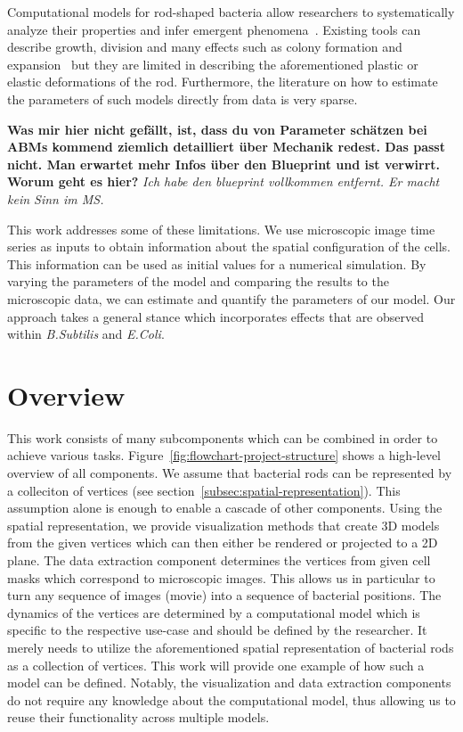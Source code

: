 \documentclass[10pt,letterpaper]{article}
\begin{document}
Computational models for rod-shaped bacteria allow researchers to systematically analyze their
properties and infer emergent phenomena~\cite{Cho2007,Jnsson2005}.
Existing tools can describe growth, division and many effects such as colony formation and
expansion~\cite{Matyjaszkiewicz2017,Doumic2020} but they are limited in describing the
aforementioned plastic or elastic deformations of the rod. Furthermore, the literature on how to
estimate the parameters of such models directly from data is very sparse.

\textbf{
    Was mir hier nicht gefällt, ist, dass du von Parameter schätzen bei ABMs kommend ziemlich
    detailliert über Mechanik redest.
    Das passt nicht.
    Man erwartet mehr Infos über den Blueprint und ist verwirrt.
    Worum geht es hier?
}
\textit{Ich habe den blueprint vollkommen entfernt. Er macht kein Sinn im MS.}

This work addresses some of these limitations.
We use microscopic image time series as inputs to obtain information about the spatial configuration
of the cells.
This information can be used as initial values for a numerical simulation.
By varying the parameters of the model and comparing the results to the microscopic data, we can
estimate and quantify the parameters of our model.
Our approach takes a general stance which incorporates effects that are observed within
\textit{B.Subtilis} and \textit{E.Coli}.

\section{Overview}
This work consists of many subcomponents which can be combined in order to achieve various tasks.
Figure~\ref{fig:flowchart-project-structure} shows a high-level overview of all components.
We assume that bacterial rods can be represented by a colleciton of vertices (see
section~\ref{subsec:spatial-representation}).
This assumption alone is enough to enable a cascade of other components.
Using the spatial representation, we provide visualization methods that create 3D models from the
given vertices which can then either be rendered or projected to a 2D plane.
The data extraction component determines the vertices from given cell masks which
correspond to microscopic images.
This allows us in particular to turn any sequence of images (movie) into a sequence of bacterial
positions.
The dynamics of the vertices are determined by a computational model which is specific
to the respective use-case and should be defined by the researcher.
It merely needs to utilize the aforementioned spatial representation of bacterial rods as a
collection of vertices.
This work will provide one example of how such a model can be defined.
Notably, the visualization and data extraction components do not require any knowledge about the
computational model, thus allowing us to reuse their functionality across multiple models.
\end{document}
